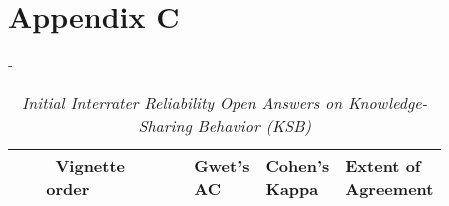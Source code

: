 \documentclass[twocolumn, issue, empirical, authordate]{jote-new-article}
\begin{document}
\pagebreak

\section{Appendix C}
\begin{table}[h!]
\begin{adjustwidth}{-\fullwidthlen}{}

\caption{\emph{Initial Interrater Reliability Open Answers on Knowledge-Sharing Behavior (KSB)}
}
\label{tab:table5}
\begin{tabular}{>{\raggedright\arraybackslash}p{0.08\linewidth} >{\raggedright\arraybackslash}p{0.210\linewidth} >{\raggedright\arraybackslash}p{0.1885\linewidth} >{\raggedright\arraybackslash}p{0.1263\linewidth} >{\raggedright\arraybackslash}p{0.1263\linewidth} >{\raggedright\arraybackslash}p{0.1262\linewidth}}

        &  \textbf{Vignette order} &   & \textbf{Gwet's AC} & \textbf{Cohen's Kappa} & \textbf{Extent of Agreement}\\ \toprule


\end{tabular}
\end{adjustwidth}
\end{table}
\end{document}
